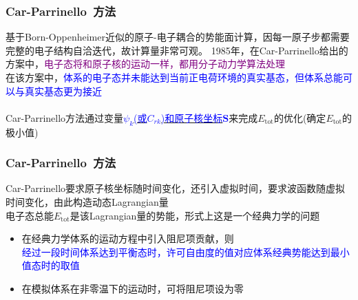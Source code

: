\frame
{
	\frametitle{\textrm{Car-Parrinello~}方法}
	基于\textrm{Born-Oppenheimer}近似的原子-电子耦合的势能面计算，因每一原子步都需要完整的电子结构自洽迭代，故计算量非常可观。
\vskip 5pt
\textrm{1985}年，在\textrm{Car-Parrinello}给出的方案中，\textcolor{purple}{电子态将和原子核的运动一样，都用分子动力学算法处理}\\
在该方案中，\textcolor{blue}{体系的电子态并未能达到当前正电荷环境的真实基态，但体系总能可以与真实基态更为接近}\\
{\fontsize{6.2pt}{5.2pt}}\\
\textrm{Car-Parrinello}方法通过变量\underline{\textcolor{blue}{$\psi_k$(或$C_{rk}$)和原子核坐标$\mathbf{S}$}}来完成$E_{\mathrm{tot}}$的优化(确定$E_{\mathrm{tot}}$的极小值)
}

\frame
{
	\frametitle{\textrm{Car-Parrinello~}方法}
	{\fontsize{6.2pt}{5.2pt}}
	\vskip 5pt
	\textrm{Car-Parrinello}要求原子核坐标随时间变化，还引入虚拟时间，要求波函数随虚拟时间变化，由此构造动态\textrm{Lagrangian}量\\
	{\fontsize{6.2pt}{5.2pt}}
	电子态总能$E_{\mathrm{tot}}$是该\textrm{Lagrangian}量的势能，形式上这是一个经典力学的问题
	\begin{itemize}
		\item 在经典力学体系的运动方程中引入阻尼项贡献，则\\
			\textcolor{blue}{经过一段时间体系达到平衡态时，许可自由度的值对应体系经典势能达到最小值态时的取值}
		\item 在模拟体系在非零温下的运动时，可将阻尼项设为零
	\end{itemize}
}


